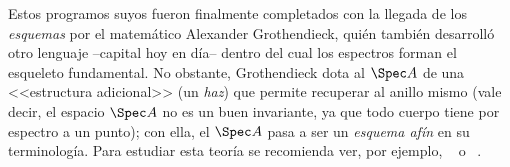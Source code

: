 \documentclass[11pt, reqno]{amsart}
\begin{document}
Estos programos suyos fueron finalmente completados con la llegada de los \emph{esquemas} por el matemático Alexander
Grothendieck, quién también desarrolló otro lenguaje --capital hoy en día-- dentro del cual los espectros forman el
esqueleto fundamental.
No obstante, Grothendieck dota al $\Spec A$ de una <<estructura adicional>> (un \emph{haz}) que permite recuperar al
anillo mismo (vale decir, el espacio $\Spec A$ no es un buen invariante, ya que todo cuerpo tiene por espectro a un
punto); con ella, el $\Spec A$ pasa a ser un \emph{esquema afín} en su terminología.
Para estudiar esta teoría se recomienda ver, por ejemplo, \citeauthor{hartshorne:algebraic}~\cite{hartshorne:algebraic}
o \citeauthor{vakil:rising_sea}~\cite{vakil:rising_sea}.

\printbibliography
\end{document}
